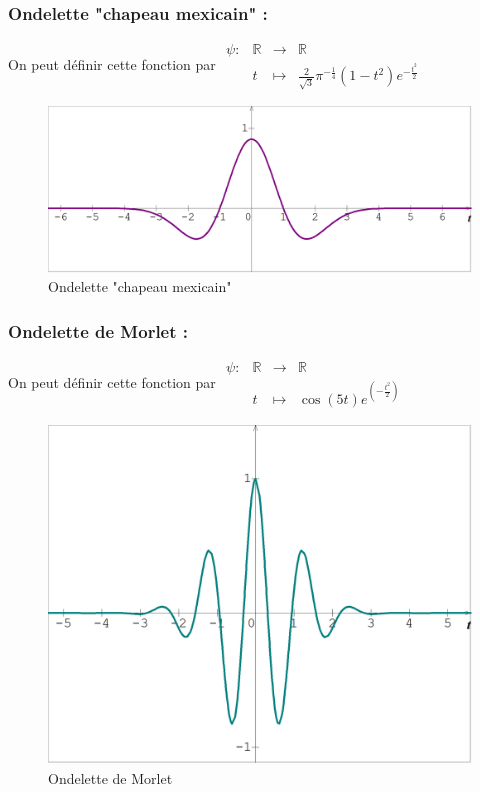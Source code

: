 \documentclass{article}
\begin{document}
\subsubsection{Ondelette "chapeau mexicain" :}

On peut définir cette fonction par $\begin{array}{lrcl}
\psi : & \mathbb{R} & \longrightarrow & \mathbb{R} \\
    & t & \longmapsto & \frac{2}{\sqrt{3}}\pi^{-\frac{1}{4}}(1-t^2)e^{-\frac{t^2}{2}} \end{array}$
    
\begin{figure}[!h]
\centering
\includegraphics[scale=0.2]{chapeau_mexicain.png}
\caption{Ondelette "chapeau mexicain"}
\label{chapmex}
\end{figure}
    
\subsubsection{Ondelette de Morlet :}

On peut définir cette fonction par $\begin{array}{lrcl}
\psi : & \mathbb{R} & \longrightarrow & \mathbb{R} \\
    & t & \longmapsto & \cos(5t)e^{(-\frac{t^2}{2})} \end{array}$
    
\begin{figure}[!h]
\centering
\includegraphics[scale=0.2]{morlet.png}
\caption{Ondelette de Morlet}
\label{morlet}
\end{figure}
\end{document}

